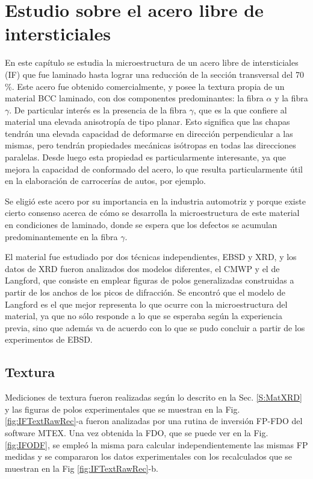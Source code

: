 \chapter{Estudio sobre el acero libre de intersticiales}\label{C:IF}
\graphicspath{{./figs/03_IF/}}

En este capítulo se estudia la microestructura de un acero libre de intersticiales (IF) que fue laminado hasta lograr una reducción de la sección transversal del 70\,\%.
Este acero fue obtenido comercialmente, y posee la textura propia de un material BCC laminado, con dos componentes predominantes: la fibra $\alpha$ y la fibra $\gamma$.
De particular interés es la presencia de la fibra $\gamma$, que es la que confiere al material una elevada anisotropía de tipo planar\cite{Engler2001,Hutchinson1984,Ray1994}.
Esto significa que las chapas tendrán una elevada capacidad de deformarse en dirección perpendicular a las mismas, pero tendrán propiedades mecánicas isótropas en todas las direcciones paralelas.
Desde luego esta propiedad es particularmente interesante, ya que mejora la capacidad de conformado del acero, lo que resulta particularmente útil en la elaboración de carrocerías de autos, por ejemplo.

Se eligió este acero por su importancia en la industria automotriz y porque existe cierto consenso acerca de cómo se desarrolla la microestructura de este material en condiciones de laminado, donde se espera que los defectos se acumulan predominantemente en la fibra $\gamma$.

El material fue estudiado por dos técnicas independientes, EBSD y XRD, y los datos de XRD fueron analizados dos modelos diferentes, el CMWP y el de Langford, que consiste en emplear figuras de polos generalizadas construidas a partir de los anchos de los picos de difracción. Se encontró que el modelo de Langford es el que mejor representa lo que ocurre con la microestructura del material, ya que no sólo responde a lo que se esperaba según la experiencia previa, sino que además va de acuerdo con lo que se pudo concluir a partir de los experimentos de EBSD.

\section{Textura}\label{S:IFText}
Mediciones de textura fueron realizadas según lo descrito en la Sec. \ref{S:MatXRD} y las figuras de polos experimentales que se muestran en la Fig. \ref{fig:IFTextRawRec}-a fueron analizadas por una rutina de inversión FP-FDO del software MTEX.
Una vez obtenida la FDO, que se puede ver en la Fig. \ref{fig:IFODF}, se empleó la misma para calcular independientemente las mismas FP medidas y se compararon los datos experimentales con los recalculados que se muestran en la Fig \ref{fig:IFTextRawRec}-b.

